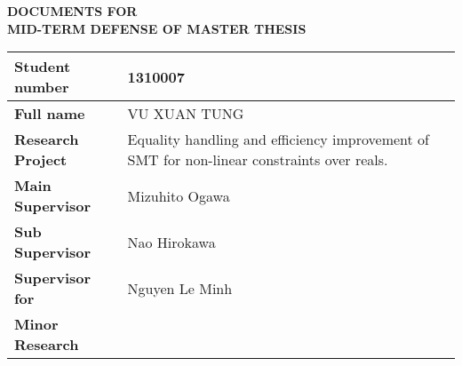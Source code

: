 \documentclass{article}
\begin{document}
\Large
\begin{center}
{\LARGE\bf DOCUMENTS FOR \\MID-TERM DEFENSE OF MASTER THESIS}
\end{center}

\vspace{10mm}

\begin{tabular}{| p{43mm} | p{12cm} | }
\hline

{\bf Student number} &  \hspace{4.7cm} 1310007 \\
\hline
{\bf Full name} &  \hspace{3.5cm} VU XUAN TUNG \\
\hline
\hline

{\bf Research Project} & Equality handling and efficiency improvement of SMT for non-linear constraints over reals. \\
\hline
{\bf Main Supervisor} & \hspace{4.5cm} Mizuhito Ogawa\\
\hline
{\bf Sub Supervisor} &  \hspace{4.5cm} Nao Hirokawa \\
\hline
{\bf Supervisor for }&  \hspace{4.5cm} Nguyen Le Minh\\
{\vspace{-7mm} \bf Minor Research} &  \\ 
\hline
\end{tabular}
\end{document}
